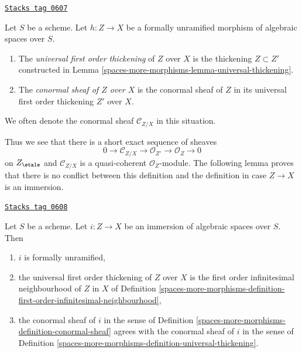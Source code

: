 \begin{definition}
\label{spaces-more-morphisms-definition-universal-thickening}
\href{https://stacks.math.columbia.edu/tag/0607}{\texttt{Stacks tag 0607}}

Let $S$ be a scheme.
Let $h : Z \to X$ be a formally unramified morphism of
algebraic spaces over $S$.
\begin{enumerate}
\item The {\it universal first order thickening} of $Z$ over $X$
is the thickening $Z \subset Z'$ constructed in
Lemma \ref{spaces-more-morphisms-lemma-universal-thickening}.
\item The {\it conormal sheaf of $Z$ over $X$} is the conormal sheaf
of $Z$ in its universal first order thickening $Z'$ over $X$.
\end{enumerate}
We often denote the conormal sheaf $\mathcal{C}_{Z/X}$ in this situation.
\end{definition}

Thus we see that there is a short exact sequence of sheaves
$$
0 \to \mathcal{C}_{Z/X} \to \mathcal{O}_{Z'} \to \mathcal{O}_Z \to 0
$$
on $Z_\etale$ and $\mathcal{C}_{Z/X}$ is a quasi-coherent
$\mathcal{O}_Z$-module. The following lemma proves that there is no
conflict between this definition and the definition in case $Z \to X$
is an immersion.

\begin{lemma}
\label{spaces-more-morphisms-lemma-immersion-universal-thickening}
\href{https://stacks.math.columbia.edu/tag/0608}{\texttt{Stacks tag 0608}}

Let $S$ be a scheme.
Let $i : Z \to X$ be an immersion of algebraic spaces over $S$. Then
\begin{enumerate}
\item $i$ is formally unramified,
\item the universal first order thickening of $Z$ over $X$ is the first order
infinitesimal neighbourhood of $Z$ in $X$ of
Definition \ref{spaces-more-morphisms-definition-first-order-infinitesimal-neighbourhood},
\item the conormal sheaf of $i$ in the sense of
Definition \ref{spaces-more-morphisms-definition-conormal-sheaf}
agrees with the conormal sheaf of $i$ in the sense of
Definition \ref{spaces-more-morphisms-definition-universal-thickening}.
\end{enumerate}
\end{lemma}

